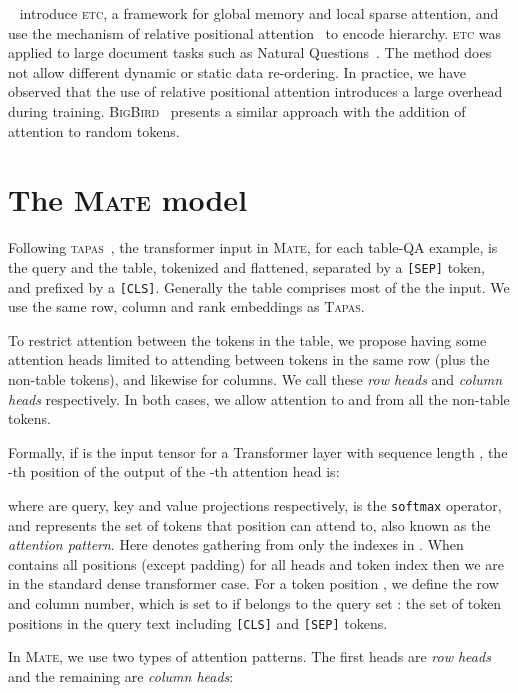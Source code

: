 \documentclass[11pt]{article}
\newcommand{\abr}[1]{\textsc{#1}}
\newcommand{\etc}{\textsc{etc}\xspace}
\newcommand{\bigbird}{\textsc{BigBird}\xspace}
\newcommand{\tapas}{\textsc{Tapas}\xspace}
\newcommand{\model}{\textsc{Mate}\xspace}
\begin{document}
~\citet{ainslie-etal-2020-etc} introduce \etc, a framework for global memory
and local sparse attention, and use the mechanism of relative positional attention~\cite{dai-etal-2019-transformer}
to encode hierarchy.
\etc was applied to large document tasks such as Natural Questions~\cite{kwiatkowski-19}.
The method does not allow different dynamic or static data re-ordering.
In practice, we have observed that the use of relative positional attention
introduces a large overhead during training. 
\bigbird~\cite{zaheer2020bigbird} presents a similar approach with the addition of attention to random tokens. 
 \section{The \model model}
\label{sec:models}

Following \abr{tapas}~\cite{herzig-etal-2020-tapas}, the transformer input in \model, for each table-QA example, is the query and the table, tokenized and flattened, separated by a \texttt{[SEP]} token, and prefixed by a \texttt{[CLS]}. Generally the table comprises most of the the input. We use the same row, column and rank embeddings as \tapas.

To restrict attention between the tokens in the table, we propose having some attention heads limited to attending between tokens in the same row (plus the non-table tokens), and likewise for columns.
We call these \emph{row heads} and \emph{column heads} respectively.
In both cases, we allow attention to and from all the non-table tokens.

Formally, if  is the input tensor for a Transformer layer with sequence length , the -th position of the output of the -th attention head is:
\vspace{-1mm}

where  are query, key and value projections respectively,  is the \texttt{softmax} operator, and  represents the set of tokens that position  can attend to, also known as the \emph{attention pattern}. 
Here  denotes gathering from  only the indexes in .
When  contains all positions (except padding) for all heads  and token index  then we are in the standard dense transformer case. For a token position , we define  the row and column number, which is set to  if  belongs to the query set : the set of token positions in the query text including \texttt{[CLS]} and \texttt{[SEP]} tokens.

In \model, we use two types of attention patterns. The first  heads are \emph{row heads} and the remaining  are \emph{column heads}:
\vspace{-2.5mm}
\end{document}
